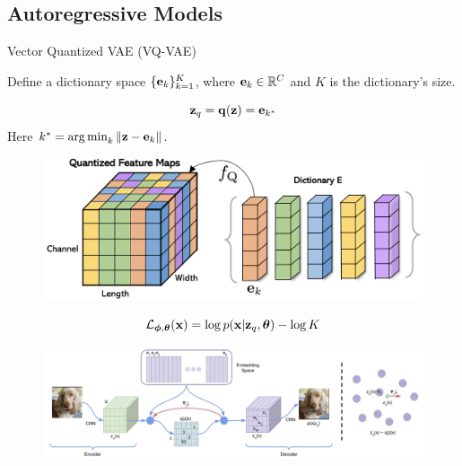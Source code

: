 \documentclass{beamer}
\begin{document}
\subsection{Autoregressive Models}
\begin{frame}{Vector Quantized VAE (VQ-VAE)}

	Define a dictionary space $\{\mathbf{e}_k\}_{k=1}^K$, where $\mathbf{e}_k \in \mathbb{R}^C$ and $K$ is the dictionary’s size.
	\vspace{-0.5cm}
	\begin{minipage}[t]{0.45\columnwidth}
		\[
			\mathbf{z}_q = \mathbf{q} (\mathbf{z}) = \mathbf{e}_{k^*}
		\]
        Here $k^* = \operatorname*{arg\,min}_k \| \mathbf{z} - \mathbf{e}_k \|$.
	\end{minipage}%
	\begin{minipage}[t]{0.55\columnwidth}
		\vspace{-0.5cm}
		\begin{figure}
			\includegraphics[width=\linewidth]{figs/fqgan_cnn}
		\end{figure}
	\end{minipage}	
	\vspace{0.5cm}	
    \eqpause
	\[
		\mathcal{L}_{\boldsymbol{\phi}, \boldsymbol{\theta}}(\mathbf{x})  =  \log p(\mathbf{x} | \mathbf{z}_q, \boldsymbol{\theta}) - \log K
	\]
	\vspace{-0.3cm}
	\begin{figure}
		\centering
		\includegraphics[width=\linewidth]{figs/vqvae}
	\end{figure}
\end{frame}
\end{document}
